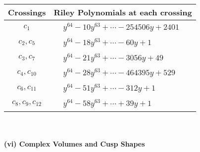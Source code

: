 \documentclass[1p]{elsarticle_modified}
\theoremstyle{definition}
\begin{document}
\begin{tabular}{m{50pt}|m{274pt}}
Crossings & \hspace{64pt}Riley Polynomials at each crossing \\
\hline $$\begin{aligned}c_{1}\end{aligned}$$&$\begin{aligned}
&y^{64}-10 y^{63}+\cdots-254506 y+2401
\end{aligned}$\\
\hline $$\begin{aligned}c_{2},c_{5}\end{aligned}$$&$\begin{aligned}
&y^{64}-18 y^{63}+\cdots-60 y+1
\end{aligned}$\\
\hline $$\begin{aligned}c_{3},c_{7}\end{aligned}$$&$\begin{aligned}
&y^{64}-21 y^{63}+\cdots-3056 y+49
\end{aligned}$\\
\hline $$\begin{aligned}c_{4},c_{10}\end{aligned}$$&$\begin{aligned}
&y^{64}-28 y^{63}+\cdots-464395 y+529
\end{aligned}$\\
\hline $$\begin{aligned}c_{6},c_{11}\end{aligned}$$&$\begin{aligned}
&y^{64}-51 y^{63}+\cdots-312 y+1
\end{aligned}$\\
\hline $$\begin{aligned}c_{8},c_{9},c_{12}\end{aligned}$$&$\begin{aligned}
&y^{64}-58 y^{63}+\cdots+39 y+1
\end{aligned}$\\
\hline
\end{tabular}\\~\\
\newpage\flushleft \textbf{(vi) Complex Volumes and Cusp Shapes}
\end{document}

